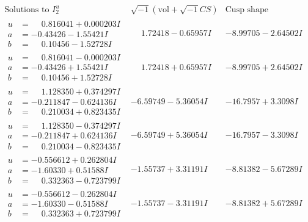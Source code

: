 \documentclass[1p]{elsarticle_modified}
\theoremstyle{definition}
\newcommand{\I}{\sqrt{-1}}
\begin{document}
$$\begin{array}{c|c|c}  
\text{Solutions to }I^u_{2}& \I (\text{vol} + \sqrt{-1}CS) & \text{Cusp shape}\\
 \hline 
\begin{aligned}
u &= \phantom{-}0.816041 + 0.000203 I \\
a &= -0.43426 - 1.55421 I \\
b &= \phantom{-}0.10456 - 1.52728 I\end{aligned}
 & \phantom{-}1.72418 - 0.65957 I & -8.99705 - 2.64502 I \\ \hline\begin{aligned}
u &= \phantom{-}0.816041 - 0.000203 I \\
a &= -0.43426 + 1.55421 I \\
b &= \phantom{-}0.10456 + 1.52728 I\end{aligned}
 & \phantom{-}1.72418 + 0.65957 I & -8.99705 + 2.64502 I \\ \hline\begin{aligned}
u &= \phantom{-}1.128350 + 0.374297 I \\
a &= -0.211847 - 0.624136 I \\
b &= \phantom{-}0.210034 + 0.823435 I\end{aligned}
 & -6.59749 - 5.36054 I & -16.7957 + 3.3098 I \\ \hline\begin{aligned}
u &= \phantom{-}1.128350 - 0.374297 I \\
a &= -0.211847 + 0.624136 I \\
b &= \phantom{-}0.210034 - 0.823435 I\end{aligned}
 & -6.59749 + 5.36054 I & -16.7957 - 3.3098 I \\ \hline\begin{aligned}
u &= -0.556612 + 0.262804 I \\
a &= -1.60330 + 0.51588 I \\
b &= \phantom{-}0.332363 - 0.723799 I\end{aligned}
 & -1.55737 + 3.31191 I & -8.81382 - 5.67289 I \\ \hline\begin{aligned}
u &= -0.556612 - 0.262804 I \\
a &= -1.60330 - 0.51588 I \\
b &= \phantom{-}0.332363 + 0.723799 I\end{aligned}
 & -1.55737 - 3.31191 I & -8.81382 + 5.67289 I \\ \hline\begin{aligned}

\end{aligned}
\end{array}$$
\end{document}
